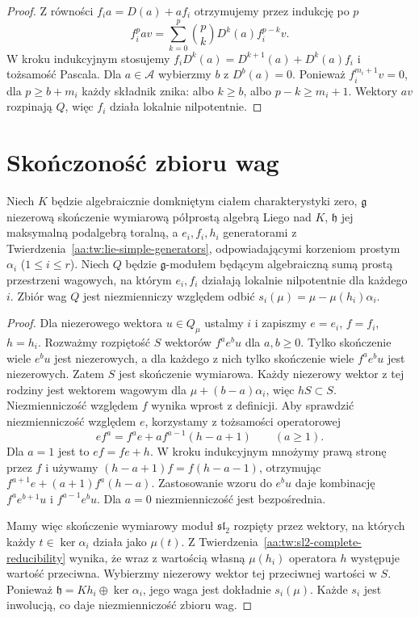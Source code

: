 \begin{proof}
Z równości $f_i a=D(a)+af_i$ otrzymujemy przez indukcję po $p$
\[
 f_i^p a v=\sum_{k=0}^{p}\binom pk D^k(a)f_i^{p-k}v.
\]
W kroku indukcyjnym stosujemy $f_iD^k(a)=D^{k+1}(a)+D^k(a)f_i$ i tożsamość Pascala. Dla $a\in\mathcal A$ wybierzmy $b$ z $D^b(a)=0$. Ponieważ $f_i^{m_i+1}v=0$, dla $p\ge b+m_i$ każdy składnik znika: albo $k\ge b$, albo $p-k\ge m_i+1$. Wektory $av$ rozpinają $Q$, więc $f_i$ działa lokalnie nilpotentnie.
\end{proof}

\section{Skończoność zbioru wag}

\begin{lemat}
\label{aa:lem:integrable-weight-symmetry}
Niech $K$ będzie algebraicznie domkniętym ciałem charakterystyki zero, $\mathfrak g$ niezerową skończenie wymiarową półprostą algebrą Liego nad $K$, $\mathfrak h$ jej maksymalną podalgebrą toralną, a $e_i,f_i,h_i$ generatorami z Twierdzenia~\ref{aa:tw:lie-simple-generators}, odpowiadającymi korzeniom prostym $\alpha_i$ ($1\le i\le r$). Niech $Q$ będzie $\mathfrak g$-modułem będącym algebraiczną sumą prostą przestrzeni wagowych, na którym $e_i,f_i$ działają lokalnie nilpotentnie dla każdego $i$. Zbiór wag $Q$ jest niezmienniczy względem odbić $s_i(\mu)=\mu-\mu(h_i)\alpha_i$.
\end{lemat}
\begin{proof}
Dla niezerowego wektora $u\in Q_\mu$ ustalmy $i$ i zapiszmy $e=e_i$, $f=f_i$, $h=h_i$. Rozważmy rozpiętość $S$ wektorów $f^a e^b u$ dla $a,b\ge0$. Tylko skończenie wiele $e^b u$ jest niezerowych, a dla każdego z nich tylko skończenie wiele $f^a e^b u$ jest niezerowych. Zatem $S$ jest skończenie wymiarowa. Każdy niezerowy wektor z tej rodziny jest wektorem wagowym dla $\mu+(b-a)\alpha_i$, więc $hS\subset S$. Niezmienniczość względem $f$ wynika wprost z definicji. Aby sprawdzić niezmienniczość względem $e$, korzystamy z tożsamości operatorowej
\[
 ef^a=f^a e+a f^{a-1}(h-a+1)\qquad(a\ge1).
\]
Dla $a=1$ jest to $ef=fe+h$. W kroku indukcyjnym mnożymy prawą stronę przez $f$ i używamy $(h-a+1)f=f(h-a-1)$, otrzymując $f^{a+1}e+(a+1)f^a(h-a)$. Zastosowanie wzoru do $e^b u$ daje kombinację $f^a e^{b+1}u$ i $f^{a-1}e^b u$. Dla $a=0$ niezmienniczość jest bezpośrednia.

Mamy więc skończenie wymiarowy moduł $\mathfrak{sl}_2$ rozpięty przez wektory, na których każdy $t\in\ker\alpha_i$ działa jako $\mu(t)$. Z Twierdzenia~\ref{aa:tw:sl2-complete-reducibility} wynika, że wraz z wartością własną $\mu(h_i)$ operatora $h$ występuje wartość przeciwna. Wybierzmy niezerowy wektor tej przeciwnej wartości w $S$. Ponieważ $\mathfrak h=Kh_i\oplus\ker\alpha_i$, jego waga jest dokładnie $s_i(\mu)$. Każde $s_i$ jest inwolucją, co daje niezmienniczość zbioru wag.
\end{proof}

